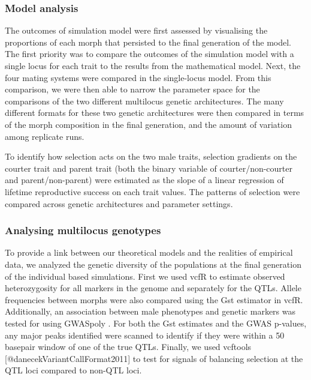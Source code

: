 \documentclass[
  11pt,
]{article}
\begin{document}
\hypertarget{model-analysis}{%
\subsubsection{Model analysis}\label{model-analysis}}

The outcomes of simulation model were first assessed by visualising the proportions of each morph that persisted to the final generation of the model.
The first priority was to compare the outcomes of the simulation model with a single locus for each trait to the results from the mathematical model.
Next, the four mating systems were compared in the single-locus model.
From this comparison, we were then able to narrow the parameter space for the comparisons of the two different multilocus genetic architectures.
The many different formats for these two genetic architectures were then compared in terms of the morph composition in the final generation, and the amount of variation among replicate runs.

To identify how selection acts on the two male traits, selection gradients on the courter trait and parent trait (both the binary variable of courter/non-courter and parent/non-parent) were estimated as the slope of a linear regression of lifetime reproductive success on each trait values. The patterns of selection were compared across genetic architectures and parameter settings.

\hypertarget{analysing-multilocus-genotypes}{%
\subsubsection{Analysing multilocus genotypes}\label{analysing-multilocus-genotypes}}

To provide a link between our theoretical models and the realities of
empirical data, we analyzed the genetic diversity of the populations at
the final generation of the individual based simulations. First we used
vcfR to estimate observed heterozygosity for all markers in the genome
and separately for the QTLs. Allele frequencies between morphs were also
compared using the Gst estimator in vcfR. Additionally, an association
between male phenotypes and genetic markers was tested for using
GWASpoly . For both the Gst estimates and the GWAS p-values, any major
peaks identified were scanned to identify if they were within a 50
basepair window of one of the true QTLs.
Finally, we used vcftools {[}@danecekVariantCallFormat2011{]} to test for signals of balancing selection at the QTL loci compared to non-QTL loci.
\end{document}
